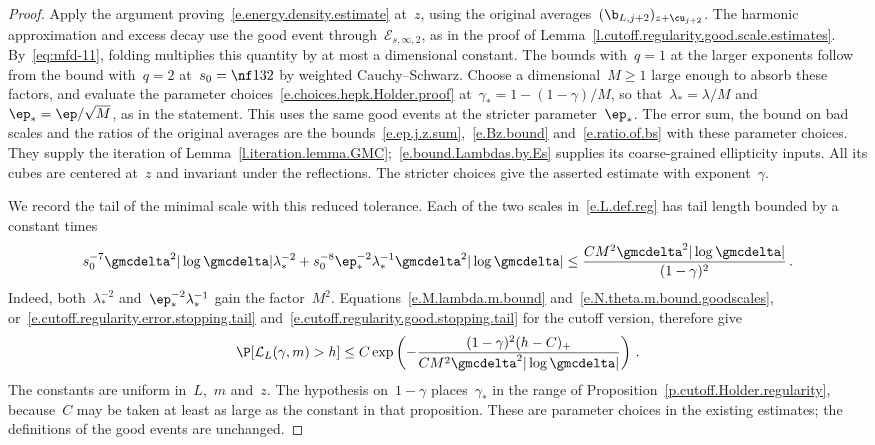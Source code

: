 \documentclass[11pt]{amsart}
\begin{document}
\begin{proof}
Apply the argument proving~\eqref{e.energy.density.estimate} at~$z$, using the original averages~$(\b_{L,j+2})_{z+\cu_{j+2}}$. The harmonic approximation and excess decay use the good event through~$\mathcal E_{s,\infty,2}$, as in the proof of Lemma~\ref{l.cutoff.regularity.good.scale.estimates}. By~\eqref{eq:mfd-11}, folding multiplies this quantity by at most a dimensional constant. The bounds with~$q=1$ at the larger exponents follow from the bound with~$q=2$ at~$s_0=\nf1{32}$ by weighted Cauchy--Schwarz. Choose a dimensional~$M\geq1$ large enough to absorb these factors, and evaluate the parameter choices~\eqref{e.choices.hepk.Holder.proof} at~$\gamma_*=1-(1-\gamma)/M$, so that~$\lambda_*=\lambda/M$ and~$\ep_*=\ep/\sqrt M$, as in the statement. This uses the same good events at the stricter parameter~$\ep_*$. The error sum, the bound on bad scales and the ratios of the original averages are the bounds~\eqref{e.ep.j.z.sum},~\eqref{e.Bz.bound} and~\eqref{e.ratio.of.bs} with these parameter choices. They supply the iteration of Lemma~\ref{l.iteration.lemma.GMC};~\eqref{e.bound.Lambdas.by.Es} supplies its coarse-grained ellipticity inputs. All its cubes are centered at~$z$ and invariant under the reflections. The stricter choices give the asserted estimate with exponent~$\gamma$.

\smallskip

We record the tail of the minimal scale with this reduced tolerance. Each of the two scales in~\eqref{e.L.def.reg} has tail length bounded by a constant times
\begin{equation*}
	s_0^{-7}\gmcdelta^2|\log\gmcdelta|\lambda_*^{-2}
	+s_0^{-8}\ep_*^{-2}\lambda_*^{-1}
	\gmcdelta^2|\log\gmcdelta|
	\leq \frac{CM^2\gmcdelta^2|\log\gmcdelta|}{(1-\gamma)^2}\,.
\end{equation*}
Indeed, both~$\lambda_*^{-2}$ and~$\ep_*^{-2}\lambda_*^{-1}$ gain the factor~$M^2$. Equations~\eqref{e.M.lambda.m.bound} and~\eqref{e.N.theta.m.bound.goodscales}, or~\eqref{e.cutoff.regularity.error.stopping.tail} and~\eqref{e.cutoff.regularity.good.stopping.tail} for the cutoff version, therefore give
\begin{equation*}
	\P[\mathcal L_L(\gamma,m)>h]
	\leq C\exp\left(-\frac{(1-\gamma)^2(h-C)_+}
	{CM^2\gmcdelta^2|\log\gmcdelta|}\right)\,.
\end{equation*}
The constants are uniform in~$L$,~$m$ and~$z$. The hypothesis on~$1-\gamma$ places~$\gamma_*$ in the range of Proposition~\ref{p.cutoff.Holder.regularity}, because~$C$ may be taken at least as large as the constant in that proposition. These are parameter choices in the existing estimates; the definitions of the good events are unchanged.
\end{proof}
\end{document}
